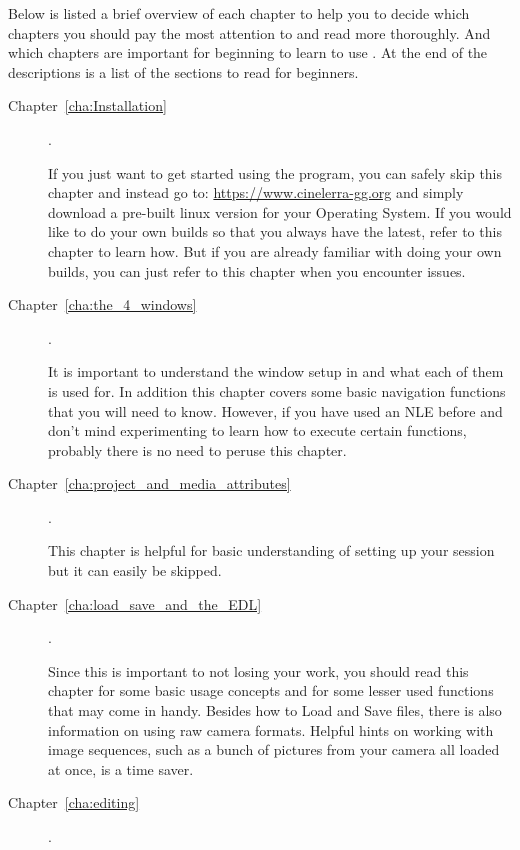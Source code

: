 Below is listed a brief overview of each chapter to help you to decide which chapters you should pay the most attention to and read more thoroughly.
And which chapters are important for beginning to learn to use \CGG{}. At the end of the descriptions is a list of the sections to read for beginners.

\begin{description}
    \item[Chapter~\ref{cha:Installation} ] .

        If you just want to get started using the program, you can safely skip this chapter and instead go to:
        {\small \url{https://www.cinelerra-gg.org}}
        and simply download a pre-built linux version for your Operating System. If you would like to do your own builds so that you always have the latest, refer to this chapter to learn how.
        But if you are already familiar with doing your own builds, you can just refer to this chapter when you encounter issues.
    \item[Chapter~\ref{cha:the_4_windows} ] .

        It is important to understand the window setup in \CGG{} and what each of them is used for.
        In addition this chapter covers some basic navigation functions that you will need to know.
        However, if you have used an NLE before and don’t mind experimenting to learn how to execute certain functions, probably there is no need to peruse this chapter.
    \item[Chapter~\ref{cha:project_and_media_attributes}] .

        This chapter is helpful for basic understanding of setting up your session but it can easily be skipped.

    \item[Chapter~\ref{cha:load_save_and_the_EDL}] .

        Since this is important to not losing your work, you should read this chapter for some basic usage concepts and for some lesser used functions that may come in handy.
        Besides how to Load and Save files, there is also information on using raw camera formats.
        Helpful hints on working with image sequences, such as a bunch of pictures from your camera all loaded at once, is a time saver.

    \item[Chapter~\ref{cha:editing}] .


\end{description}
